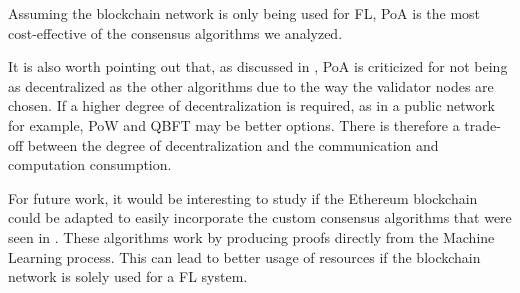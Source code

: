 Assuming the blockchain network is only being used for FL, PoA is the most cost-effective of the consensus algorithms we analyzed.

It is also worth pointing out that, as discussed in , PoA is criticized for not being as decentralized as the other algorithms due to the way the validator nodes are chosen. If a higher degree of decentralization is required, as in a public network for example, PoW and QBFT may be better options. There is therefore a trade-off between the degree of decentralization and the communication and computation consumption.

For future work, it would be interesting to study if the Ethereum blockchain could be adapted to easily incorporate the custom consensus algorithms that were seen in . These algorithms work by producing proofs directly from the Machine Learning process. This can lead to better usage of resources if the blockchain network is solely used for a FL system.